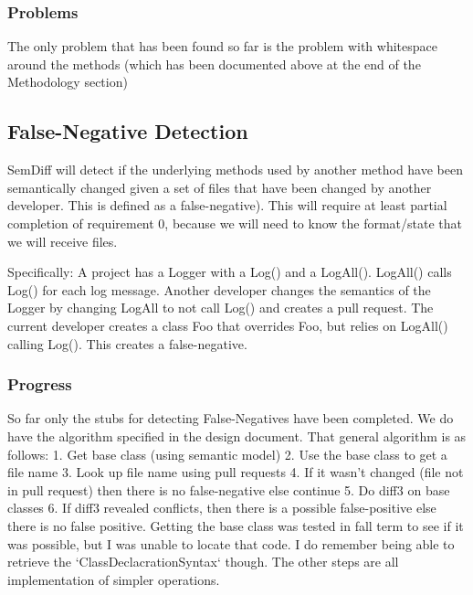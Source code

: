 \documentclass[10pt,draftclsnofoot,onecolumn]{IEEEtran}
\begin{document}
\subsubsection{Problems}
The only problem that has been found so far is the problem with whitespace around the methods (which has been documented above at the end of the Methodology section)

\subsection{False-Negative Detection}
SemDiff will detect if the underlying methods used by another method have been semantically changed given a set of files that have been changed by another developer. This is defined as a false-negative). This will require at least partial completion of requirement 0, because we will need to know the format/state that we will receive files.

Specifically: A project has a Logger with a Log() and a LogAll(). LogAll() calls Log() for each log message. Another developer changes the semantics of the Logger by changing LogAll to not call Log() and creates a pull request. The current developer creates a class Foo that overrides Foo, but relies on LogAll() calling Log(). This creates a false-negative.

\subsubsection{Progress}
So far only the stubs for detecting False-Negatives have been completed. We do have the algorithm specified in the design document. That general algorithm is as follows:
1.	Get base class (using semantic model)
2.	Use the base class to get a file name
3.	Look up file name using pull requests
4.	If it wasn’t changed (file not in pull request) then there is no false-negative else continue
5.	Do diff3 on base classes
6.	If diff3 revealed conflicts, then there is a possible false-positive else there is no false positive.
Getting the base class was tested in fall term to see if it was possible, but I was unable to locate that code. I do remember being able to retrieve the `ClassDeclacrationSyntax` though. The other steps are all implementation of simpler operations.
\end{document}
